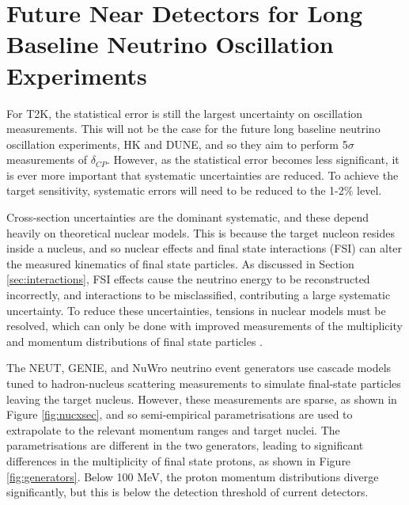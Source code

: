 \chapter{Future Near Detectors for Long Baseline Neutrino Oscillation Experiments}

For T2K, the statistical error is still the largest uncertainty on oscillation measurements. This will not be the case for the future long baseline neutrino oscillation experiments, HK and DUNE, and so they aim to perform 5$\sigma$ measurements of $\delta_{CP}$. However, as the statistical error becomes less significant, it is ever more important that systematic uncertainties are reduced. To achieve the target sensitivity, systematic errors will need to be reduced to the 1-2$\%$ level.

Cross-section uncertainties are the dominant systematic, and these depend heavily on theoretical nuclear models. This is because the target nucleon resides inside a nucleus, and so nuclear effects and final state interactions (FSI) can alter the measured kinematics of final state particles. As discussed in Section \ref{sec:interactions}, FSI effects cause the neutrino energy to be reconstructed incorrectly, and interactions to be misclassified, contributing a large systematic uncertainty. To reduce these uncertainties, tensions in nuclear models must be resolved, which can only be done with improved measurements of the multiplicity and momentum distributions of final state particles \cite{nustecscat}.

The NEUT, GENIE, and NuWro \cite{nuwro} neutrino event generators use cascade models tuned to hadron-nucleus scattering measurements to simulate final-state particles leaving the target nucleus. However, these measurements are sparse, as shown in Figure \ref{fig:nucxsec}, and so semi-empirical parametrisations are used to extrapolate to the relevant momentum ranges and target nuclei. The parametrisations are different in the two generators, leading to significant differences in the multiplicity of final state protons, as shown in Figure \ref{fig:generators}. Below 100 MeV, the proton momentum distributions diverge significantly, but this is below the detection threshold of current detectors.

